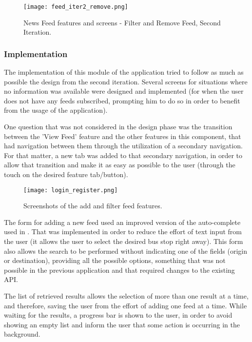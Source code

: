 \begin{figure}[htb]
  \begin{center}
    \leavevmode
    \texttt{[image: feed\_iter2\_remove.png]}
    \caption{News Feed features and screens - Filter and Remove Feed, Second Iteration.}
    \label{fig:feed_iter2_remove}
  \end{center}
\end{figure}

\subsubsection{Implementation} 

The implementation of this module of the application tried to follow as much as possible the design from the second iteration. Several screens for situations where no information was available were designed and implemented (for when the user does not have any feeds subscribed, prompting him to do so in order to benefit from the usage of the application).

One question that was not considered in the design phase was the transition between the 'View Feed' feature and the other features in this component, that had navigation between them through the utilization of a secondary navigation. For that matter, a new tab was added to that secondary navigation, in order to allow that transition and make it as easy as possible to the user (through the touch on the desired feature tab/button).

\begin{figure}[!h]
  \begin{center}
    \leavevmode
    \texttt{[image: login\_register.png]}
    \caption{Screenshots of the add and filter feed features.}
    \label{fig:feed1}
  \end{center}
\end{figure}

The form for adding a new feed used an improved version of the auto-complete used in \cite{kn:Gon12}. That was implemented in order to reduce the effort of text input from the user (it allows the user to select the desired bus stop right away). This form also allows the search to be performed without indicating one of the fields (origin or destination), providing all the possible options, something that was not possible in the previous application and that required changes to the existing API.

The list of retrieved results allows the selection of more than one result at a time, and therefore, saving the user from the effort of adding one feed at a time.
While waiting for the results, a progress bar is shown to the user, in order to avoid showing an empty list and inform the user that some action is occurring in the background.

